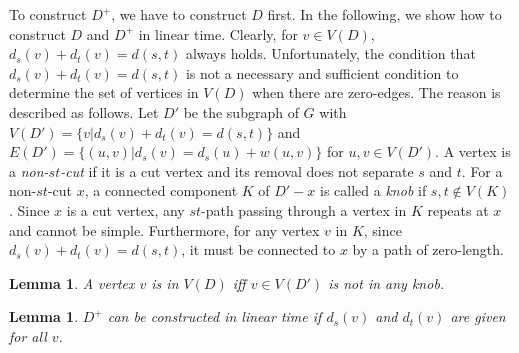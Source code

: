 \documentclass[review]{elsarticle}
\def\squarebox#1{\hbox to #1{\hfill\vbox to #1{\vfill}}}
\renewcommand{\qed}{\hspace*{\fill}
            \vbox{\hrule\hbox{\vrule\squarebox{.667em}\vrule}\hrule}\smallskip\newline}
\newtheorem{lem}[thm]{Lemma}
\begin{document}
To construct $D^+$, we have to construct $D$ first. In the
following, we show how to construct $D$ and $D^+$ in linear time.
Clearly, for $v\in V(D)$, $d_s(v)+d_t(v)=d(s,t)$ always holds.
Unfortunately, the condition that $d_s(v)+d_t(v)=d(s,t)$ is not a
necessary and sufficient condition to determine the set of vertices
in $V(D)$ when there are zero-edges. The reason is described as
follows. Let $D'$ be the subgraph of $G$ with
$V(D')=\{v|d_s(v)+d_t(v)=d(s,t)\}$ and $E(D')=
\{(u,v)|d_s(v)=d_s(u)+w(u,v)\}$ for $u,v\in V(D')$. A vertex is a
{\em non-$st$-cut} if it is a cut vertex and its removal does not
separate $s$ and $t$. For a non-$st$-cut $x$, a connected component
$K$ of $D'-x$ is called a {\em knob} if $s,t\notin V(K)$. Since $x$
is a cut vertex, any $st$-path passing through a vertex in $K$
repeats at $x$ and cannot be simple. Furthermore, for any vertex $v$
in $K$, since $d_s(v)+d_t(v)=d(s,t)$, it must be connected to $x$ by
a path of zero-length.

\begin{lem}\label{D+}
A vertex $v$ is in $V(D)$ iff $v\in V(D')$ is not in any knob.
\end{lem}

\begin{lem}
$D^+$ can be constructed in linear time if $d_s(v)$ and $d_t(v)$ are
given for all $v$.
\end{lem}
\end{document}
